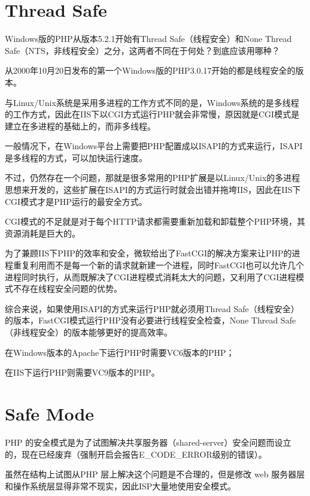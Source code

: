 \section{Thread Safe}

Windows版的PHP从版本5.2.1开始有Thread Safe（线程安全）和None Thread Safe（NTS，非线程安全）之分，这两者不同在于何处\cite{thread_safe}？到底应该用哪种？

从2000年10月20日发布的第一个Windows版的PHP3.0.17开始的都是线程安全的版本。

与Linux/Unix系统是采用多进程的工作方式不同的是，Windows系统的是多线程的工作方式，因此在IIS下以CGI方式运行PHP就会非常慢，原因就是CGI模式是建立在多进程的基础上的，而非多线程。

一般情况下，在Windows平台上需要把PHP配置成以ISAPI的方式来运行，ISAPI是多线程的方式，可以加快运行速度。


不过，仍然存在一个问题，那就是很多常用的PHP扩展是以Linux/Unix的多进程思想来开发的，这些扩展在ISAPI的方式运行时就会出错并拖垮IIS，因此在IIS下CGI模式才是PHP运行的最安全方式。

CGI模式的不足就是对于每个HTTP请求都需要重新加载和卸载整个PHP环境，其资源消耗是巨大的。

为了兼顾IIS下PHP的效率和安全，微软给出了FastCGI的解决方案来让PHP的进程重复利用而不是每一个新的请求就新建一个进程，同时FastCGI也可以允许几个进程同时执行，从而既解决了CGI进程模式消耗太大的问题，又利用了CGI进程模式不存在线程安全问题的优势。

综合来说，如果使用ISAPI的方式来运行PHP就必须用Thread Safe（线程安全）的版本，FastCGI模式运行PHP没有必要进行线程安全检查，None Thread Safe（非线程安全）的版本能够更好的提高效率。

\begin{compactitem}
\item 在Windows版本的Apache下运行PHP时需要VC6版本的PHP；
\item 在IIS下运行PHP则需要VC9版本的PHP。
\end{compactitem}

\section{Safe Mode}

PHP 的安全模式是为了试图解决共享服务器（shared-server）安全问题而设立的，现在已经废弃（强制开启会报告E\_CODE\_ERROR级别的错误）。



虽然在结构上试图从PHP 层上解决这个问题是不合理的，但是修改 web 服务器层和操作系统层显得非常不现实，因此ISP大量地使用安全模式。



